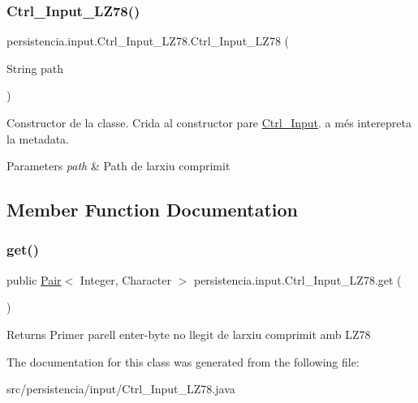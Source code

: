 \subsubsection{\texorpdfstring{Ctrl\+\_\+\+Input\+\_\+\+L\+Z78()}{Ctrl\_Input\_LZ78()}}
{\footnotesize\ttfamily persistencia.\+input.\+Ctrl\+\_\+\+Input\+\_\+\+L\+Z78.\+Ctrl\+\_\+\+Input\+\_\+\+L\+Z78 (\begin{DoxyParamCaption}\item[{String}]{path }\end{DoxyParamCaption})\hspace{0.3cm}{\ttfamily [inline]}}



Constructor de la classe. Crida al constructor pare \hyperlink{classpersistencia_1_1input_1_1Ctrl__Input}{Ctrl\+\_\+\+Input}. a més interepreta la metadata. 


\begin{DoxyParams}{Parameters}
{\em path} & Path de l\textquotesingle{}arxiu comprimit \\
\hline
\end{DoxyParams}


\subsection{Member Function Documentation}
\mbox{\label{classpersistencia_1_1input_1_1Ctrl__Input__LZ78_ae09535962f284be3a76369845c15b78c}} 
\subsubsection{\texorpdfstring{get()}{get()}}
{\footnotesize\ttfamily public \hyperlink{classdomini_1_1utils_1_1Pair}{Pair}$<$ Integer, Character $>$ persistencia.\+input.\+Ctrl\+\_\+\+Input\+\_\+\+L\+Z78.\+get (\begin{DoxyParamCaption}{ }\end{DoxyParamCaption})\hspace{0.3cm}{\ttfamily [inline]}}

\begin{DoxyReturn}{Returns}
Primer parell enter-\/byte no llegit de l\textquotesingle{}arxiu comprimit amb L\+Z78 
\end{DoxyReturn}


The documentation for this class was generated from the following file\+:\begin{DoxyCompactItemize}
\item 
src/persistencia/input/Ctrl\+\_\+\+Input\+\_\+\+L\+Z78.\+java\end{DoxyCompactItemize}
